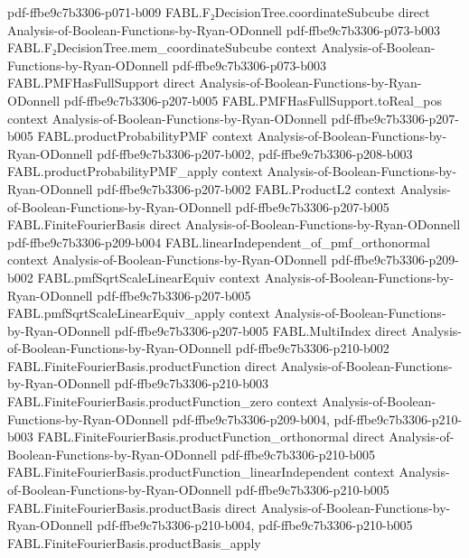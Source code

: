 \begin{theorem}
  {pdf-ffbe9c7b3306-p071-b009}
\proofstep
  {FABL.F₂DecisionTree.coordinateSubcube}
  {direct}
  {Analysis-of-Boolean-Functions-by-Ryan-ODonnell}
  {pdf-ffbe9c7b3306-p073-b003}
\proofstep
  {FABL.F₂DecisionTree.mem_coordinateSubcube}
  {context}
  {Analysis-of-Boolean-Functions-by-Ryan-ODonnell}
  {pdf-ffbe9c7b3306-p073-b003}
\proofstep
  {FABL.PMFHasFullSupport}
  {direct}
  {Analysis-of-Boolean-Functions-by-Ryan-ODonnell}
  {pdf-ffbe9c7b3306-p207-b005}
\proofstep
  {FABL.PMFHasFullSupport.toReal_pos}
  {context}
  {Analysis-of-Boolean-Functions-by-Ryan-ODonnell}
  {pdf-ffbe9c7b3306-p207-b005}
\proofstep
  {FABL.productProbabilityPMF}
  {context}
  {Analysis-of-Boolean-Functions-by-Ryan-ODonnell}
  {pdf-ffbe9c7b3306-p207-b002,
    pdf-ffbe9c7b3306-p208-b003}
\proofstep
  {FABL.productProbabilityPMF_apply}
  {context}
  {Analysis-of-Boolean-Functions-by-Ryan-ODonnell}
  {pdf-ffbe9c7b3306-p207-b002}
\proofstep
  {FABL.ProductL2}
  {context}
  {Analysis-of-Boolean-Functions-by-Ryan-ODonnell}
  {pdf-ffbe9c7b3306-p207-b005}
\proofstep
  {FABL.FiniteFourierBasis}
  {direct}
  {Analysis-of-Boolean-Functions-by-Ryan-ODonnell}
  {pdf-ffbe9c7b3306-p209-b004}
\proofstep
  {FABL.linearIndependent_of_pmf_orthonormal}
  {context}
  {Analysis-of-Boolean-Functions-by-Ryan-ODonnell}
  {pdf-ffbe9c7b3306-p209-b002}
\proofstep
  {FABL.pmfSqrtScaleLinearEquiv}
  {context}
  {Analysis-of-Boolean-Functions-by-Ryan-ODonnell}
  {pdf-ffbe9c7b3306-p207-b005}
\proofstep
  {FABL.pmfSqrtScaleLinearEquiv_apply}
  {context}
  {Analysis-of-Boolean-Functions-by-Ryan-ODonnell}
  {pdf-ffbe9c7b3306-p207-b005}
\proofstep
  {FABL.MultiIndex}
  {direct}
  {Analysis-of-Boolean-Functions-by-Ryan-ODonnell}
  {pdf-ffbe9c7b3306-p210-b002}
\proofstep
  {FABL.FiniteFourierBasis.productFunction}
  {direct}
  {Analysis-of-Boolean-Functions-by-Ryan-ODonnell}
  {pdf-ffbe9c7b3306-p210-b003}
\proofstep
  {FABL.FiniteFourierBasis.productFunction_zero}
  {context}
  {Analysis-of-Boolean-Functions-by-Ryan-ODonnell}
  {pdf-ffbe9c7b3306-p209-b004,
    pdf-ffbe9c7b3306-p210-b003}
\proofstep
  {FABL.FiniteFourierBasis.productFunction_orthonormal}
  {direct}
  {Analysis-of-Boolean-Functions-by-Ryan-ODonnell}
  {pdf-ffbe9c7b3306-p210-b005}
\proofstep
  {FABL.FiniteFourierBasis.productFunction_linearIndependent}
  {context}
  {Analysis-of-Boolean-Functions-by-Ryan-ODonnell}
  {pdf-ffbe9c7b3306-p210-b005}
\proofstep
  {FABL.FiniteFourierBasis.productBasis}
  {direct}
  {Analysis-of-Boolean-Functions-by-Ryan-ODonnell}
  {pdf-ffbe9c7b3306-p210-b004,
    pdf-ffbe9c7b3306-p210-b005}
\proofstep
  {FABL.FiniteFourierBasis.productBasis_apply}

\end{theorem}
